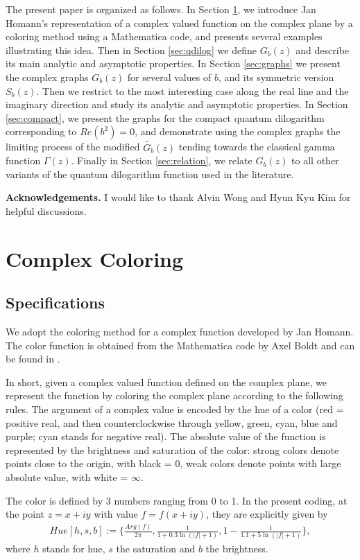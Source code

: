 \documentclass[10pt,reqno]{article}
\def\G{\Gamma}
\def\til[#1]{\widetilde{#1}}
\def\oo{\infty}
\newcommand{\Eq}[1]{\begin{align}#1\end{align}}
\numberwithin{equation}{section}
\begin{document}
The present paper is organized as follows. In Section \ref{sec:complex}, we introduce Jan Homann's representation of a complex valued function on the complex plane by a coloring method using a Mathematica code, and presents several examples illustrating this idea. Then in Section \ref{sec:qdilog} we define $G_b(z)$ and describe its main analytic and asymptotic properties. In Section \ref{sec:graphs} we present the complex graphs $G_b(z)$ for several values of $b$, and its symmetric version $S_b(z)$. Then we restrict to the most interesting case along the real line and the imaginary direction and study its analytic and asymptotic properties. In Section \ref{sec:compact}, we present the graphs for the compact quantum dilogarithm corresponding to $Re(b^2)=0$, and demonstrate using the complex graphs the limiting process of the modified $\til[G_b](z)$ tending towards the classical gamma function $\G(z)$. Finally in Section \ref{sec:relation}, we relate $G_b(z)$ to all other variants of the quantum dilogarithm function used in the literature. 

\textbf{Acknowledgements.} I would like to thank Alvin Wong and Hyun Kyu Kim for helpful discussions.

\section{Complex Coloring}\label{sec:complex}
\subsection{Specifications} We adopt the coloring method for a complex function developed by Jan Homann. The color function is obtained from the Mathematica code by Axel Boldt and can be found in \cite{AB}. 

In short, given a complex valued function defined on the complex plane, we represent the function by coloring the complex plane according to the following rules. The argument of a complex value is encoded by the hue of a color (red = positive real, and then counterclockwise through yellow, green, cyan, blue and purple; cyan stands for negative real). The absolute value of the function is represented by the brightness and saturation of the color: strong colors denote points close to the origin, with black = 0, weak colors denote points with large absolute value, with white = $\oo$.

The color is defined by 3 numbers ranging from 0 to 1. In the present coding, at the point $z=x+iy$ with value $f=f(x+iy)$, they are explicitly given by
\Eq{Hue[h,s,b]:=\{\frac{Arg(f)}{2\pi}, \frac{1}{1+0.3 \ln(|f|+1)}, 1-\frac{1}{1.1+5\ln(|f|+1)}\},}
where $h$ stands for hue, $s$ the saturation and $b$ the brightness.
\end{document}
